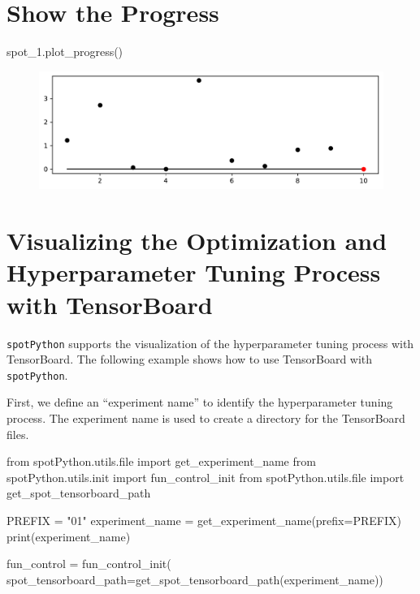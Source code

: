 \documentclass[
  letterpaper,
  DIV=11,
  numbers=noendperiod]{scrreprt}
\newenvironment{Shaded}{\begin{snugshade}}{\end{snugshade}}
\newcommand{\BuiltInTok}[1]{\textcolor[rgb]{0.00,0.23,0.31}{#1}}
\newcommand{\ImportTok}[1]{\textcolor[rgb]{0.00,0.46,0.62}{#1}}
\newcommand{\NormalTok}[1]{\textcolor[rgb]{0.00,0.23,0.31}{#1}}
\newcommand{\OperatorTok}[1]{\textcolor[rgb]{0.37,0.37,0.37}{#1}}
\newcommand{\StringTok}[1]{\textcolor[rgb]{0.13,0.47,0.30}{#1}}
\begin{document}
\hypertarget{show-the-progress}{%
\section{Show the Progress}\label{show-the-progress}}

\begin{Shaded}
\begin{Highlighting}[]
\NormalTok{spot\_1.plot\_progress()}
\end{Highlighting}
\end{Shaded}

\begin{figure}[H]

{\centering \includegraphics{01_spot_intro_files/figure-pdf/cell-12-output-1.pdf}

}

\end{figure}

\hypertarget{sec-visualizing-tensorboard-01}{%
\section{Visualizing the Optimization and Hyperparameter Tuning Process
with TensorBoard}\label{sec-visualizing-tensorboard-01}}

\texttt{spotPython} supports the visualization of the hyperparameter
tuning process with TensorBoard. The following example shows how to use
TensorBoard with \texttt{spotPython}.

First, we define an ``experiment name'' to identify the hyperparameter
tuning process. The experiment name is used to create a directory for
the TensorBoard files.

\begin{Shaded}
\begin{Highlighting}[]
\ImportTok{from}\NormalTok{ spotPython.utils.}\BuiltInTok{file} \ImportTok{import}\NormalTok{ get\_experiment\_name}
\ImportTok{from}\NormalTok{ spotPython.utils.init }\ImportTok{import}\NormalTok{ fun\_control\_init}
\ImportTok{from}\NormalTok{ spotPython.utils.}\BuiltInTok{file} \ImportTok{import}\NormalTok{ get\_spot\_tensorboard\_path}

\NormalTok{PREFIX }\OperatorTok{=} \StringTok{"01"}
\NormalTok{experiment\_name }\OperatorTok{=}\NormalTok{ get\_experiment\_name(prefix}\OperatorTok{=}\NormalTok{PREFIX)}
\BuiltInTok{print}\NormalTok{(experiment\_name)}

\NormalTok{fun\_control }\OperatorTok{=}\NormalTok{ fun\_control\_init(}
\NormalTok{    spot\_tensorboard\_path}\OperatorTok{=}\NormalTok{get\_spot\_tensorboard\_path(experiment\_name))}
\end{Highlighting}
\end{Shaded}
\end{document}
